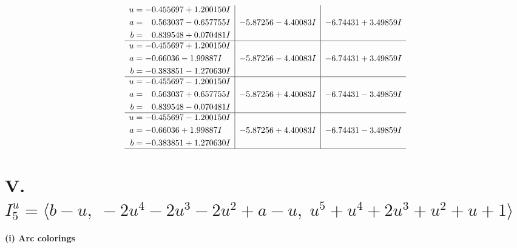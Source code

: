 \documentclass[1p]{elsarticle_modified}
\theoremstyle{definition}
\begin{document}
$$\begin{array}{c|c|c}
\begin{aligned}
u &= -0.455697 + 1.200150 I \\
a &= \phantom{-}0.563037 - 0.657755 I \\
b &= \phantom{-}0.839548 + 0.070481 I\end{aligned}
 & -5.87256 - 4.40083 I & -6.74431 + 3.49859 I \\ \hline\begin{aligned}
u &= -0.455697 + 1.200150 I \\
a &= -0.66036 - 1.99887 I \\
b &= -0.383851 - 1.270630 I\end{aligned}
 & -5.87256 - 4.40083 I & -6.74431 + 3.49859 I \\ \hline\begin{aligned}
u &= -0.455697 - 1.200150 I \\
a &= \phantom{-}0.563037 + 0.657755 I \\
b &= \phantom{-}0.839548 - 0.070481 I\end{aligned}
 & -5.87256 + 4.40083 I & -6.74431 - 3.49859 I \\ \hline\begin{aligned}
u &= -0.455697 - 1.200150 I \\
a &= -0.66036 + 1.99887 I \\
b &= -0.383851 + 1.270630 I\end{aligned}
 & -5.87256 + 4.40083 I & -6.74431 - 3.49859 I\\
 \hline 
 \end{array}$$\newpage\newpage\renewcommand{\arraystretch}{1}
\centering \section*{V. $I^u_{5}= \langle b- u,\;-2 u^4-2 u^3-2 u^2+a- u,\;u^5+u^4+2 u^3+u^2+u+1 \rangle$}
\flushleft \textbf{(i) Arc colorings}\\
\end{document}
